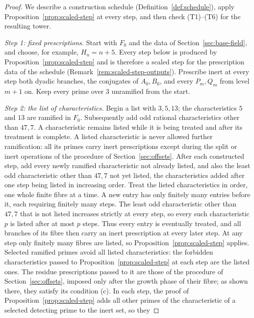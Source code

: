 \documentclass[11pt]{article}
\theoremstyle{plain}
\theoremstyle{definition}
\theoremstyle{remark}
\begin{document}
\begin{proof}
We describe a construction schedule
(Definition~\ref{def:schedule}), apply
Proposition~\ref{prop:scaled-step} at every step, and then check
(T1)--(T6) for the resulting tower.

\emph{Step 1: fixed prescriptions.}  Start with $F_0$ and the data of
Section~\ref{sec:base-field}, and choose, for example, $H_n=n+5$.
Every step below is produced by Proposition~\ref{prop:scaled-step} and
is therefore a scaled step for the prescription data of the schedule
(Remark~\ref{rem:scaled-step-outputs}).  Prescribe inert at every step both dyadic
branches, the conjugates of $A_0,B_0$, and every $P_m,Q_m$ from level
$m+1$ on.  Keep every prime over $3$ unramified from the start.

\emph{Step 2: the list of characteristics.}  Begin a list with $3,5,13$;
the characteristics $5$ and $13$ are ramified in $F_0$.  Subsequently add odd rational characteristics other than $47,7$.  A
characteristic remains listed while it is being treated and after its
treatment is complete.  A listed characteristic is never allowed further
ramification: all its primes carry inert prescriptions except during the
split or inert operations of the procedure of
Section~\ref{sec:offsets}.  After each constructed step, add every newly
ramified characteristic not already listed, and also the least odd
characteristic other than $47,7$ not yet listed, the characteristics added after one step
being listed in increasing order.  Treat the listed characteristics in
order, one whole finite fibre at a time.  A new entry has only finitely
many entries before it, each requiring finitely many steps.  The least
odd characteristic other than $47,7$ that is not listed increases strictly
at every step, so every such characteristic $p$ is listed after at most
$p$ steps.  Thus every
entry is eventually treated, and all branches of its fibre then carry an
inert prescription at every later step.  At any step only finitely many
fibres are listed, so Proposition~\ref{prop:scaled-step} applies.
Selected ramified primes avoid all listed characteristics: the forbidden
characteristics passed to Proposition~\ref{prop:scaled-step} at each
step are the listed ones.  The residue prescriptions passed to it are
those of the procedure of Section~\ref{sec:offsets}, imposed only after
the growth phase of their fibre; as shown there, they satisfy its
condition (c).  In each step, the proof of
Proposition~\ref{prop:scaled-step} adds all other primes of the
characteristic of a selected detecting prime to the inert set, so they

\end{proof}
\end{document}
